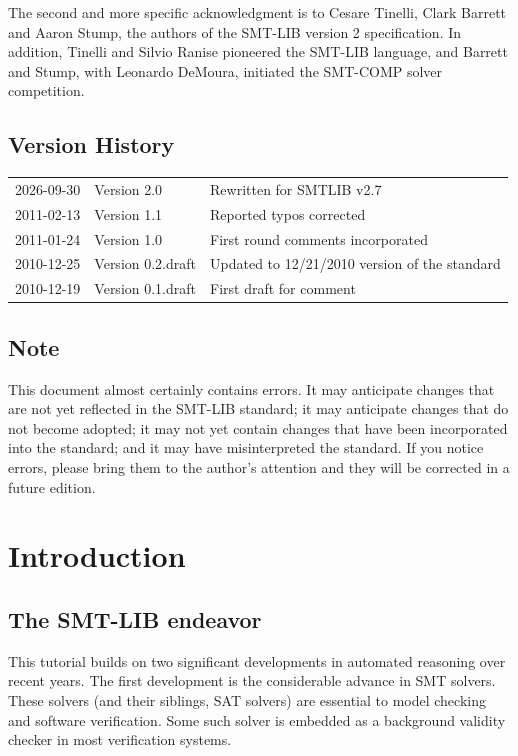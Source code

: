 \documentclass[12pt,oneside]{report}
\begin{document}
The second and more specific acknowledgment is to Cesare Tinelli, Clark Barrett and Aaron Stump, the authors of the SMT-LIB version 2 specification.
In addition, Tinelli and Silvio Ranise pioneered the SMT-LIB language, and Barrett and Stump, with Leonardo DeMoura, initiated the SMT-COMP solver competition. 

\section*{Version History}

\begin{tabular}{llp{4in}}
2026-09-30 & Version 2.0 & Rewritten for SMTLIB v2.7 \\
2011-02-13 & Version 1.1 & Reported typos corrected \\
2011-01-24 & Version 1.0 & First round comments incorporated \\
2010-12-25 & Version 0.2.draft & Updated to 12/21/2010 version of the standard \\
2010-12-19 & Version 0.1.draft & First draft for comment
\end{tabular}

\section*{Note}
This document almost certainly contains errors. It may anticipate changes that are not yet reflected in the SMT-LIB standard;
it may anticipate changes that do not become adopted; it may not yet contain changes that have been incorporated into the standard;
and it may have misinterpreted the standard. If you notice errors, please bring them to the author's attention and they will be corrected 
in a future edition.


\chapter{Introduction}

\section{The SMT-LIB endeavor}

This tutorial builds on two significant developments in automated reasoning over recent years.
The first development is the considerable advance in SMT solvers.  These solvers (and their siblings, SAT solvers) are essential to model checking and software verification.  Some such solver is embedded as a background validity checker in most verification systems. 
\end{document}
